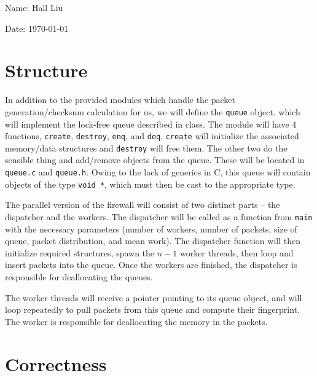 \documentclass{article}
\begin{document}
Name: Hall Liu

Date: \today 
\vspace{1.5cm}

\section*{Structure}
In addition to the provided modules which handle the packet generation/checksum calculation for us, we will define the \verb|queue| object, which will implement the lock-free queue described in class. The module will have 4 functions, \verb|create|, \verb|destroy|, \verb|enq|, and \verb|deq|. \verb|create| will initialize the associated memory/data structures and \verb|destroy| will free them. The other two do the sensible thing and add/remove objects from the queue. These will be located in \verb|queue.c| and \verb|queue.h|. Owing to the lack of generics in C, this queue will contain objects of the type \verb|void *|, which must then be cast to the appropriate type. 

The parallel version of the firewall will consist of two distinct parts -- the dispatcher and the workers. The dispatcher will be called as a function from \verb|main| with the necessary parameters (number of workers, number of packets, size of queue, packet distribution, and mean work).  The dispatcher function will then initialize required structures, spawn the $n-1$ worker threads, then loop and insert packets into the queue. Once the workers are finished, the dispatcher is responsible for deallocating the queues.

The worker threads will receive a pointer pointing to its queue object, and will loop repeatedly to pull packets from this queue and compute their fingerprint. The worker is responsible for deallocating the memory in the packets. 
\section*{Correctness}
\end{document}
